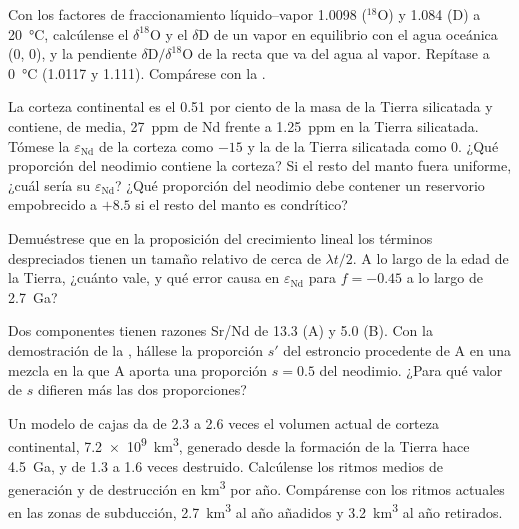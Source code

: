 \begin{exercise}[$\star\star$]\label{exo:b2:isotope-geochemistry:8}
Con los factores de fraccionamiento líquido--vapor 1.0098 ($^{18}$O) y 1.084 (D) a
\qty{20}{\degreeCelsius}, calcúlense el $\delta^{18}\mathrm{O}$ y el $\delta\mathrm{D}$ de un
vapor en equilibrio con el agua oceánica (0, 0), y la pendiente
$\delta\mathrm{D}/\delta^{18}\mathrm{O}$ de la recta que va del agua al vapor. Repítase
a \qty{0}{\degreeCelsius} (1.0117 y 1.111). Compárese con la .
\end{exercise}

\begin{exercise}[$\star\star$]\label{exo:b2:isotope-geochemistry:9}
La corteza continental es el 0.51 por ciento de la masa de la Tierra silicatada y contiene,
de media, \qty{27}{ppm} de Nd frente a \qty{1.25}{ppm} en la Tierra silicatada. Tómese
la $\varepsilon_{\mathrm{Nd}}$ de la corteza como $-15$ y la de la Tierra silicatada como 0. ¿Qué
proporción del neodimio contiene la corteza? Si el resto del manto fuera uniforme,
¿cuál sería su $\varepsilon_{\mathrm{Nd}}$? ¿Qué proporción del neodimio debe contener un
reservorio empobrecido a $+8.5$ si el resto del manto es condrítico?
\end{exercise}

\begin{exercise}[$\star\star\star$]\label{exo:b2:isotope-geochemistry:10}
Demuéstrese que en la proposición del crecimiento lineal los términos despreciados tienen un tamaño
relativo de cerca de $\lambda t/2$. A lo largo de la edad de la Tierra, ¿cuánto vale, y qué
error causa en $\varepsilon_{\mathrm{Nd}}$ para $f = -0.45$ a lo largo de
\qty{2.7}{Ga}?
\end{exercise}

\begin{exercise}[$\star\star\star$]\label{exo:b2:isotope-geochemistry:11}
Dos componentes tienen razones Sr/Nd de 13.3 (A) y 5.0 (B). Con la demostración de la
, hállese la proporción $s'$ del estroncio procedente de A en una mezcla en la que A
aporta una proporción $s = 0.5$ del neodimio. ¿Para qué valor de $s$ difieren más las dos
proporciones?
\end{exercise}

\begin{exercise}[$\star\star\star$]\label{exo:b2:isotope-geochemistry:12}
Un modelo de cajas da de 2.3 a 2.6 veces el volumen actual de corteza continental,
\qty{7.2e9}{km^3}, generado desde la formación de la Tierra hace \qty{4.5}{Ga}, y de 1.3 a 1.6
veces destruido. Calcúlense los ritmos medios de generación y de destrucción en
\unit{km^3} por año. Compárense con los ritmos actuales en las zonas de subducción,
\qty{2.7}{km^3} al año añadidos y \qty{3.2}{km^3} al año retirados.
\end{exercise}

